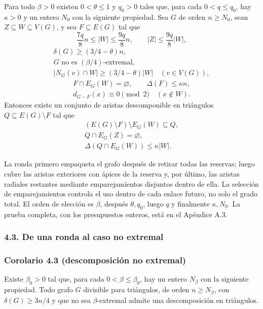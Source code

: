 \documentclass[spanish,11pt,a4paper]{article}
\begin{document}
Para todo \(\beta>0\) existen \(0<\theta\le1\) y \(q_0>0\) tales que, para cada \(0<q\le q_0\), hay \(\kappa>0\) y un entero \(N_0\) con la siguiente propiedad. Sea \(G\) de orden \(n\ge N_0\), sean \(Z\subseteq W\subseteq V(G)\), y sea \(F\subseteq E(G)\) tal que \[\frac{7q}{8}n\le|W|\le\frac{9q}{8}n,\qquad |Z|\le\frac{9q}{8}|W|,
\tag{4.4}\] \[\begin{gathered}
\delta(G)\ge(3/4-\theta)n,\\
G\text{ no es }(\beta/4)\text{-extremal},\\
|N_G(v)\cap W|\ge(3/4-\theta)|W|\quad(v\in V(G)),
\end{gathered}
\tag{4.5}\] \[\begin{gathered}
F\cap E_G(W)=\varnothing,\qquad\Delta(F)\le\kappa n,\\
d_{G-F}(x)\equiv0\pmod2\quad(x\notin W).
\end{gathered}
\tag{4.6}\] Entonces existe un conjunto de aristas descomponible en triángulos \(Q\subseteq E(G)\setminus F\) tal que \[\begin{gathered}
(E(G)\setminus F)\setminus E_G(W)\subseteq Q,\\
Q\cap E_G(Z)=\varnothing,\\
\Delta(Q\cap E_G(W))\le\kappa|W|.
\end{gathered}
\tag{4.7}\]

La ronda primero empaqueta el grafo después de retirar todas las reservas; luego cubre las aristas exteriores con ápices de la reserva y, por último, las aristas radiales restantes mediante emparejamientos disjuntos dentro de ella. La selección de emparejamientos controla el uso dentro de cada enlace futuro, no solo el grado total. El orden de elección es \(\beta\), después \(\theta,q_0\), luego \(q\) y finalmente \(\kappa,N_0\). La prueba completa, con los presupuestos enteros, está en el Apéndice A.3.


\subsubsection{4.3. De una ronda al caso no extremal}\label{de-una-ronda-al-caso-no-extremal}

\subsubsection{Corolario 4.3 (descomposición no extremal)}\label{corolario-4.3-descomposiciuxf3n-no-extremal}

Existe \(\beta_0>0\) tal que, para cada \(0<\beta\le\beta_0\), hay un entero \(N_\beta\) con la siguiente propiedad. Todo grafo \(G\) divisible para triángulos, de orden \(n\ge N_\beta\), con \(\delta(G)\ge3n/4\) y que no sea \(\beta\)-extremal admite una descomposición en triángulos.
\end{document}
